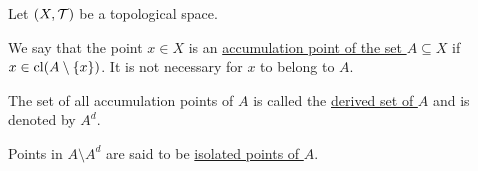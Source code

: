 \begin{definition}\label{def:derived_set}\cite[24]{Engelking1989}
  Let $(X, \mathcal T)$ be a topological space.

  \begin{defenum}
    \item\label{def:derived_set/accumulation_point} We say that the point $x \in X$ is an \ul{accumulation point of the set $A \subseteq X$} if $x \in \operatorname{cl}(A \setminus \{ x \})$. It is not necessary for $x$ to belong to $A$.

    \item\label{def:derived_set/derived_set} The set of all accumulation points of $A$ is called the \ul{derived set of $A$} and is denoted by $A^d$.

    \item\label{def:derived_set/isolated_point} Points in $A \setminus A^d$ are said to be \ul{isolated points of $A$}.
  \end{defenum}
\end{definition}
